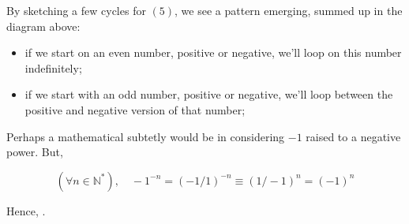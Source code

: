 \documentclass[solutions.tex]{subfiles}
\begin{document}
\hr

\begin{figure}[H]
	\centering
\end{figure}

By sketching a few cycles for $(5)$, we see a pattern emerging, summed
up in the diagram above:
\begin{itemize}
	\item if we start on an even number, positive or negative, we'll loop
	on this number indefinitely;
	\item if we start with an odd number, positive or negative,
	we'll loop between the positive and negative version of
	that number;
\end{itemize}

Perhaps a mathematical subtetly would be in considering $-1$ raised to
a negative power. But,

\[ (\forall n \in \mathbb{N}^*),\quad -1^{-n} = (-1/1)^{-n} \equiv (1/-1)^n = (-1)^n \]

Hence, .
\end{document}
